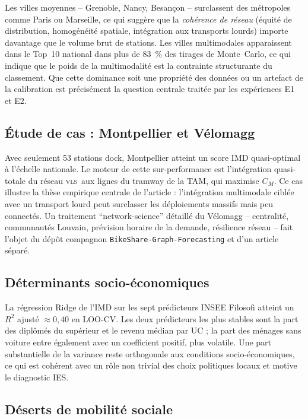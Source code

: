 \documentclass[11pt,a4paper]{article}
\newcommand{\VLS}{\textsc{vls}\xspace}
\begin{document}
Les villes moyennes -- Grenoble, Nancy, Besan\c{c}on -- surclassent
des métropoles comme Paris ou Marseille, ce qui suggère que la
\emph{cohérence de réseau} (équité de distribution, homogénéité
spatiale, intégration aux transports lourds) importe davantage que
le volume brut de stations. Les villes multimodales apparaissent
dans le Top~10 national dans plus de \SI{83}{\percent} des tirages
de Monte~Carlo, ce qui indique que le poids de la multimodalité
est la contrainte structurante du classement. Que cette dominance
soit une propriété des données ou un artefact de la calibration
est précisément la question centrale traitée par les expériences
E1 et E2.

\subsection{Étude de cas : Montpellier et Vélomagg}

Avec seulement 53 stations dock, Montpellier atteint un score IMD
quasi-optimal à l'échelle nationale. Le moteur de cette
sur-performance est l'intégration quasi-totale du réseau \VLS\ aux
lignes du tramway de la TAM, qui maximise $C_M$. Ce cas illustre
la thèse empirique centrale de l'article : l'intégration
multimodale ciblée avec un transport lourd peut surclasser les
déploiements massifs mais peu connectés. Un traitement
\enquote{network-science} détaillé du Vélomagg -- centralité,
communautés Louvain, prévision horaire de la demande, résilience
réseau -- fait l'objet du dépôt compagnon
\texttt{BikeShare-Graph-Forecasting} et d'un article séparé.

\subsection{Déterminants socio-économiques}

La régression Ridge de l'IMD sur les sept prédicteurs INSEE
Filosofi atteint un $R^2$ ajusté $\approx 0{,}40$ en LOO-CV. Les
deux prédicteurs les plus stables sont la part des diplômés du
supérieur et le revenu médian par UC ; la part des ménages sans
voiture entre également avec un coefficient positif, plus
volatile. Une part substantielle de la variance reste orthogonale
aux conditions socio-économiques, ce qui est cohérent avec un
rôle non trivial des choix politiques locaux et motive le
diagnostic IES.

\subsection{Déserts de mobilité sociale}
\end{document}
